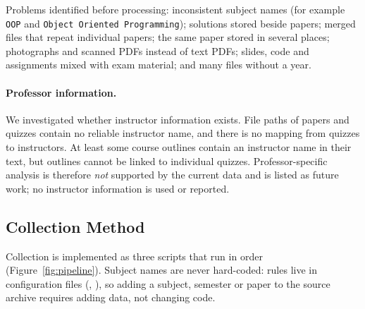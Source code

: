 \documentclass[11pt,a4paper]{article}
\begin{document}
Problems identified before processing: inconsistent subject names (for example \texttt{OOP} and \texttt{Object Oriented Programming}); solutions stored beside papers; merged files that repeat individual papers; the same paper stored in several places; photographs and scanned PDFs instead of text PDFs; slides, code and assignments mixed with exam material; and many files without a year.

\paragraph{Professor information.} We investigated whether instructor information exists. File paths of papers and quizzes contain no reliable instructor name, and there is no mapping from quizzes to instructors. At least some course outlines contain an instructor name in their text, but outlines cannot be linked to individual quizzes. Professor-specific analysis is therefore \emph{not} supported by the current data and is listed as future work; no instructor information is used or reported.

\subsection{Collection Method}
\label{sec:collection}
Collection is implemented as three scripts that run in order (Figure~\ref{fig:pipeline}). Subject names are never hard-coded: rules live in configuration files (, ), so adding a subject, semester or paper to the source archive requires adding data, not changing code.
\end{document}
